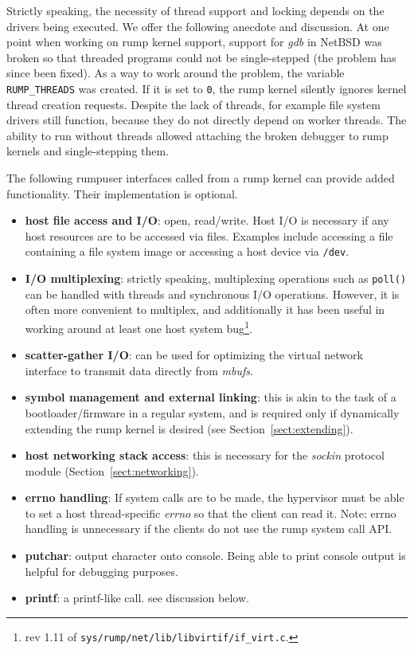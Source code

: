 Strictly speaking, the necessity of thread support and locking
depends on the drivers being executed.  We offer the following
anecdote and discussion.  At one point when working on rump kernel
support, support for \textit{gdb} in NetBSD was broken so that
threaded programs could not be single-stepped (the problem has
since been fixed).  As a way to work around the problem, the variable
\verb+RUMP_THREADS+ was created.  If it is set to \texttt{0}, the
rump kernel silently ignores kernel thread creation requests.
Despite the lack of threads, for example file system drivers still
function, because they do not directly depend on worker threads.
The ability to run without threads allowed attaching the broken debugger
to rump kernels and single-stepping them.

The following rumpuser interfaces called from a rump kernel can
provide added functionality.  Their implementation is optional.

\begin{itemize}
\item   \textbf{host file access and I/O}: open, read/write.  Host I/O
	is necessary if any host resources are to be accessed via
	files.  Examples include accessing a file containing a file
	system image or accessing a host device via \texttt{/dev}.
\item   \textbf{I/O multiplexing}: strictly speaking, multiplexing
	operations such as \texttt{poll()} can be handled with
	threads and synchronous I/O operations.  However, it is
	often more convenient to multiplex, and additionally it
	has been useful in working around at least one host
	system bug\footnote{
		rev 1.11 of \texttt{sys/rump/net/lib/libvirtif/if\_virt.c}.
	}.
\item   \textbf{scatter-gather I/O}: can be used for optimizing
	the virtual network interface to transmit data directly
	from \textit{mbufs}\cite{stevens:tcpip2}.
\item   \textbf{symbol management and external linking}: this is
	akin to the task of a bootloader/firmware in a regular
	system, and is required only if dynamically extending the
	rump kernel is desired (see Section~\ref{sect:extending}).
\item   \textbf{host networking stack access}: this is necessary
	for the \textit{sockin} protocol module
	(Section~\ref{sect:networking}).
\item   \textbf{errno handling}: If system calls are to be made,
	the hypervisor must be able to set a host thread-specific
	\textit{errno} so that the client can read it.
	Note: errno handling is unnecessary if
	the clients do not use the rump system call API.
\item   \textbf{putchar}: output character onto console.  Being
	able to print console output is helpful for debugging purposes.
\item	\textbf{printf}: a printf-like call.  see discussion below.
\end{itemize}

